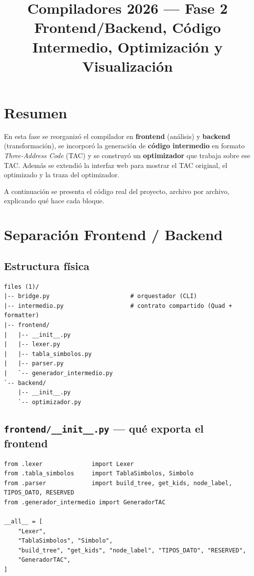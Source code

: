 \documentclass[11pt,a4paper]{article}
\title{\vspace{-1.2cm}\color{azulOscuro}\textbf{Compiladores 2026 --- Fase 2}\\[0.3em]
\large\color{black}Frontend/Backend, Código Intermedio, Optimización y Visualización}
\author{}
\date{}
\begin{document}
\maketitle
\vspace{-1.4cm}

\section{Resumen}

En esta fase se reorganizó el compilador en \textbf{frontend} (análisis) y
\textbf{backend} (transformación), se incorporó la generación de
\textbf{código intermedio} en formato \textit{Three-Address Code} (TAC) y
se construyó un \textbf{optimizador} que trabaja sobre ese TAC. Además se
extendió la interfaz web para mostrar el TAC original, el optimizado y la
traza del optimizador.

A continuación se presenta el código real del proyecto, archivo por archivo,
explicando qué hace cada bloque.

\section{Separación Frontend / Backend}

\subsection{Estructura física}

\begin{lstlisting}[style=tac]
files (1)/
|-- bridge.py                       # orquestador (CLI)
|-- intermedio.py                   # contrato compartido (Quad + formatter)
|-- frontend/
|   |-- __init__.py
|   |-- lexer.py
|   |-- tabla_simbolos.py
|   |-- parser.py
|   `-- generador_intermedio.py
`-- backend/
    |-- __init__.py
    `-- optimizador.py
\end{lstlisting}

\subsection{\texttt{frontend/\_\_init\_\_.py} --- qué exporta el frontend}

\begin{lstlisting}[style=py]
from .lexer              import Lexer
from .tabla_simbolos     import TablaSimbolos, Simbolo
from .parser             import build_tree, get_kids, node_label, TIPOS_DATO, RESERVED
from .generador_intermedio import GeneradorTAC

__all__ = [
    "Lexer",
    "TablaSimbolos", "Simbolo",
    "build_tree", "get_kids", "node_label", "TIPOS_DATO", "RESERVED",
    "GeneradorTAC",
]
\end{lstlisting}
\end{document}
